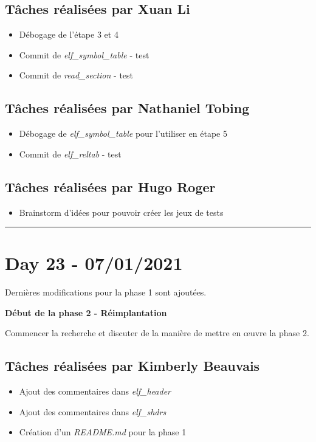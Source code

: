 \documentclass[11pt,letterpaper]{article}
\begin{document}
\subsection*{Tâches réalisées par Xuan Li}
\begin{itemize}
    \item Débogage de l'étape 3 et 4
    \item Commit de \textit{elf\_symbol\_table} - test
    \item Commit de \textit{read\_section} - test
\end{itemize}

\subsection*{Tâches réalisées par Nathaniel Tobing}
\begin{itemize}
    \item Débogage de \textit{elf\_symbol\_table} pour l'utiliser en étape 5
    \item Commit de \textit{elf\_reltab} - test
\end{itemize}

\subsection*{Tâches réalisées par Hugo Roger}
\begin{itemize}
    \item Brainstorm d’idées pour pouvoir créer les jeux de tests

\end{itemize}

\noindent\rule{13cm}{0.4pt}

\section*{Day 23 - 07/01/2021}
Dernières modifications pour la phase 1 sont ajoutées. 

\noindent \textbf{Début de la phase 2 - Réimplantation}

\noindent Commencer la recherche et discuter de la manière de mettre en œuvre 
la phase 2.


\subsection*{Tâches réalisées par Kimberly Beauvais}
\begin{itemize}
    \item Ajout des commentaires dans \textit{elf\_header}
    \item Ajout des commentaires dans \textit{elf\_shdrs}
    \item Création d'un \textit{README.md} pour la phase 1
\end{itemize}
\end{document}
